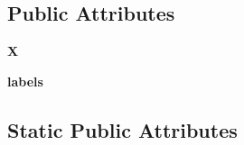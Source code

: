 \subsection*{Public Attributes}
\begin{DoxyCompactItemize}
\item 
\mbox{\label{classDataHandler_1_1DataHandler_a01c6dc2a40afc7363333f88d30b4fbd8}} 
{\bfseries X}
\item 
\mbox{\label{classDataHandler_1_1DataHandler_aac4283e57cbf9a6d45497c8ff74a3315}} 
{\bfseries labels}
\end{DoxyCompactItemize}
\subsection*{Static Public Attributes}

